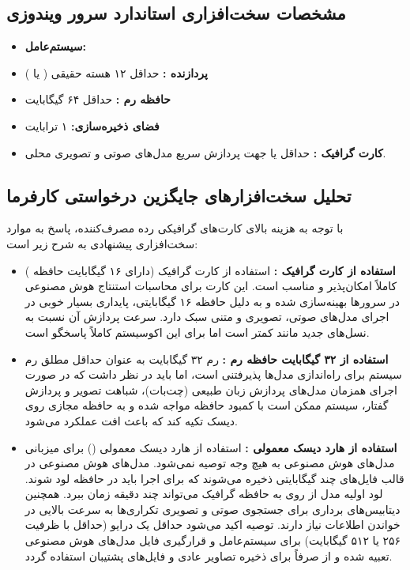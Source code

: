 \documentclass[11pt,a4paper]{article}
\begin{document}
\subsection{مشخصات سخت‌افزاری استاندارد سرور ویندوزی}
\begin{itemize}
    \item \textbf{سیستم‌عامل:} 
    \item \textbf{پردازنده :} حداقل ۱۲ هسته حقیقی ( یا )
    \item \textbf{حافظه رم :} حداقل ۶۴ گیگابایت
    \item \textbf{فضای ذخیره‌سازی:} ۱ ترابایت 
    \item \textbf{کارت گرافیک :} حداقل   یا   جهت پردازش سریع مدل‌های صوتی و تصویری محلی.
\end{itemize}

\subsection{تحلیل سخت‌افزارهای جایگزین درخواستی کارفرما}
با توجه به هزینه بالای کارت‌های گرافیکی رده مصرف‌کننده، پاسخ به موارد سخت‌افزاری پیشنهادی به شرح زیر است:
\begin{itemize}
    \item \textbf{استفاده از کارت گرافیک :} 
    استفاده از کارت گرافیک  (دارای ۱۶ گیگابایت حافظه ) کاملاً امکان‌پذیر و مناسب است. این کارت برای محاسبات استنتاج هوش مصنوعی در سرورها بهینه‌سازی شده و به دلیل حافظه ۱۶ گیگابایتی، پایداری بسیار خوبی در اجرای مدل‌های صوتی، تصویری و متنی سبک دارد. سرعت پردازش آن نسبت به نسل‌های جدید مانند  کمتر است اما برای این اکوسیستم کاملاً پاسخگو است.
    \item \textbf{استفاده از ۳۲ گیگابایت حافظه رم :}
    رم ۳۲ گیگابایت به عنوان حداقل مطلق رم سیستم برای راه‌اندازی مدل‌ها پذیرفتنی است، اما باید در نظر داشت که در صورت اجرای همزمان مدل‌های پردازش زبان طبیعی (چت‌بات)، شباهت تصویر و پردازش گفتار، سیستم ممکن است با کمبود حافظه مواجه شده و به حافظه مجازی  روی دیسک تکیه کند که باعث افت عملکرد می‌شود.
    \item \textbf{استفاده از هارد دیسک معمولی :}
    استفاده از هارد دیسک معمولی () برای میزبانی مدل‌های هوش مصنوعی به هیچ وجه توصیه نمی‌شود. مدل‌های هوش مصنوعی در قالب فایل‌های چند گیگابایتی ذخیره می‌شوند که برای اجرا باید در حافظه لود شوند. لود اولیه مدل از روی  به حافظه گرافیک می‌تواند چند دقیقه زمان ببرد. همچنین دیتابیس‌های برداری برای جستجوی صوتی و تصویری تکراری‌ها به سرعت بالایی در خواندن اطلاعات نیاز دارند. توصیه اکید می‌شود حداقل یک درایو  (حداقل با ظرفیت ۲۵۶ یا ۵۱۲ گیگابایت) برای سیستم‌عامل و قرارگیری فایل مدل‌های هوش مصنوعی تعبیه شده و از  صرفاً برای ذخیره تصاویر عادی و فایل‌های پشتیبان استفاده گردد.
\end{itemize}
\end{document}
